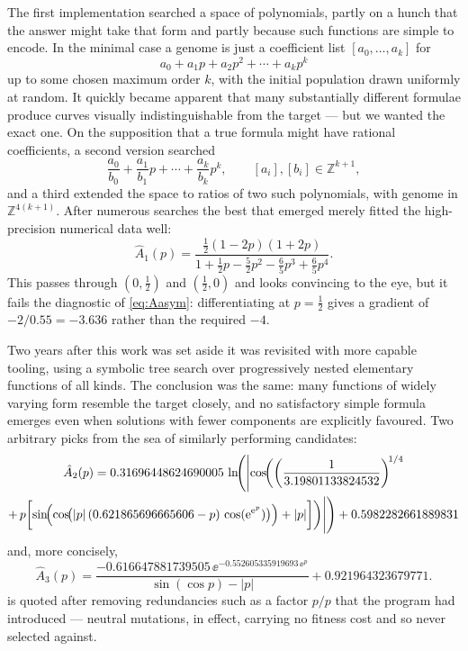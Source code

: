 The first implementation searched a space of polynomials, partly on a hunch that the
answer might take that form and partly because such functions are simple to encode.
In the minimal case a genome is just a coefficient list $[a_0,\dots,a_k]$ for
\begin{equation*}
a_0 + a_1p + a_2p^2 + \cdots + a_kp^k
\end{equation*}
up to some chosen maximum order $k$, with the initial population drawn uniformly at
random. It quickly became apparent that many substantially different formulae produce
curves visually indistinguishable from the target --- but we wanted the exact one. On
the supposition that a true formula might have rational coefficients, a second
version searched
\begin{equation*}
\frac{a_0}{b_0} + \frac{a_1}{b_1}p + \cdots + \frac{a_k}{b_k}p^k,
\qquad [a_i],[b_i]\in\mathbb{Z}^{k+1},
\end{equation*}
and a third extended the space to ratios of two such polynomials, with genome in
$\mathbb{Z}^{4(k+1)}$. After numerous searches the best that emerged merely fitted the
high-precision numerical data well:
\begin{equation}
\label{eq:A1hat}
\hat A_1(p) = \frac{\tfrac12(1-2p)(1+2p)}{1 + \tfrac12 p - \tfrac52 p^2 - \tfrac65 p^3 + \tfrac65 p^4}.
\end{equation}
This passes through $(0,\tfrac12)$ and $(\tfrac12,0)$ and looks convincing to the eye,
but it fails the diagnostic of \cref{eq:Aasym}: differentiating at $p=\tfrac12$ gives
a gradient of $-2/0.55 = -3.636$ rather than the required $-4$.

Two years after this work was set aside it was revisited with more capable tooling,
using a symbolic tree search over progressively nested elementary functions of all
kinds. The conclusion was the same: many functions of widely varying form resemble
the target closely, and no satisfactory simple formula emerges even when solutions
with fewer components are explicitly favoured. Two arbitrary picks from the sea of
similarly performing candidates:
\begin{multline}
\label{eq:A2hat}
\hat A_2(p) = 0.31696448624690005\,
\ln\!\Biggl(\Biggl|\cos\!\biggl(\left(\frac{1}{3.19801133824532}\right)^{\!1/4}\\
+\, p\biggl[\sin\!\Bigl(\cos\!\bigl(|p|\,(0.621865696665606 - p)\,\cos({\rm e}^{{\rm e}^{p}})\bigr)\Bigr) + |p|\biggr]\biggr)\Biggr|\Biggr)
+ 0.5982282661889831
\end{multline}
and, more concisely,
\begin{equation}
\label{eq:A3hat}
\hat A_3(p) = \frac{-0.616647881739505\,\ee^{-0.552605335919693\,\ee^{p}}}{\sin(\cos p) - |p|} + 0.921964323679771 .
\end{equation}
 is quoted after removing redundancies such as a factor $p/p$ that the
program had introduced --- neutral mutations, in effect, carrying no fitness cost and
so never selected against.

